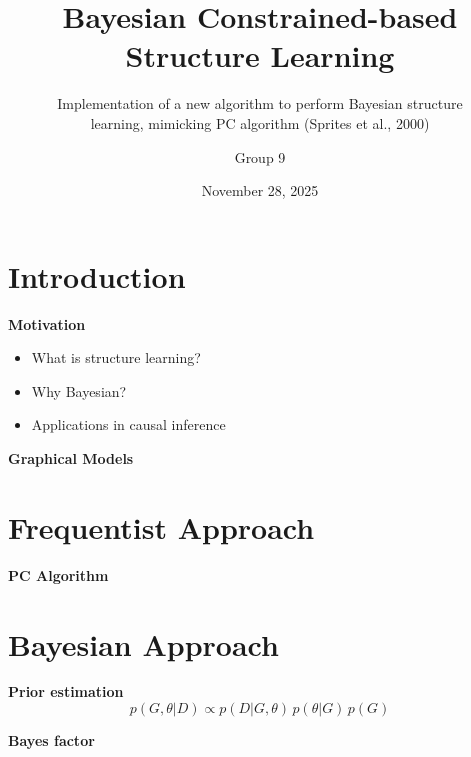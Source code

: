 \documentclass[10pt]{beamer}
\title{Bayesian Constrained-based Structure Learning}
\subtitle{\vspace{-1.5em}Implementation of a new algorithm to perform Bayesian structure\\
learning, mimicking PC algorithm (Sprites et al., 2000)}
\author{Group 9}
\institute{Politecnico di Milano}
\date{November 28, 2025}
\begin{document}
\begin{frame}
    \maketitle
\end{frame}

\section{Introduction}
\begin{frame}{\textbf{Motivation}}
  \begin{itemize}
    \item What is structure learning?
    \item Why Bayesian?
    \item Applications in causal inference
  \end{itemize}
\end{frame}

\begin{frame}{\textbf{Graphical Models}}
    \centering
\end{frame}

\section{Frequentist Approach}
\begin{frame}{\textbf{PC Algorithm}}
    
\end{frame}

\section{Bayesian Approach}
\begin{frame}{\textbf{Prior estimation}}
  \begin{equation}
    p(G, \theta | D) \propto p(D | G, \theta) \, p(\theta | G) \, p(G)
  \end{equation}
\end{frame}

\begin{frame}{\textbf{Bayes factor}}
    
\end{frame}
\end{document}
